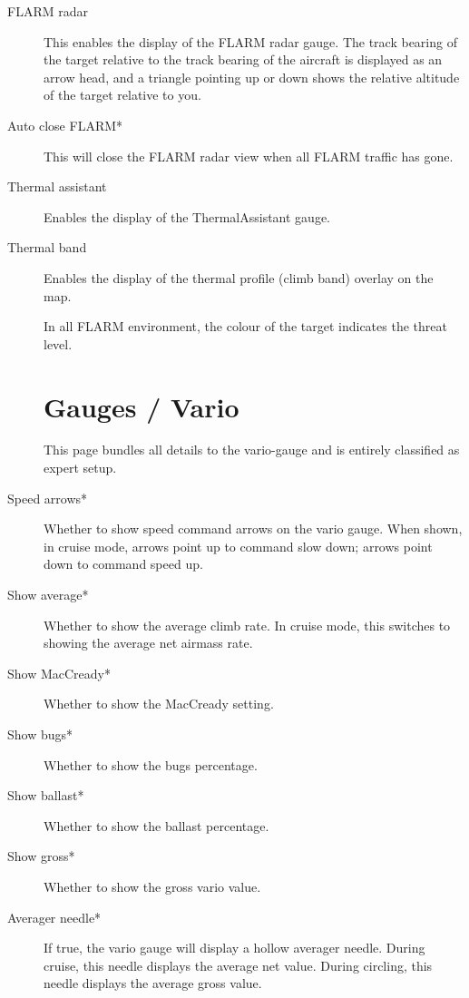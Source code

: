 \begin{description}
\item[FLARM radar]  \label{conf:flarmdisplay} This enables the display of the FLARM 
 radar gauge. The track bearing of the target relative to the track bearing of the 
 aircraft is displayed as an arrow head, and a triangle pointing up or down shows 
 the relative altitude of the target relative to you.
\\
\item[Auto close FLARM*]  This will close the FLARM radar view when all FLARM traffic has gone.
\item[Thermal assistant] \label{conf:thermalassistant} Enables the display of the
ThermalAssistant gauge.
\item[Thermal band] \label{conf:thermalband} Enables the display of the
thermal profile (climb band) overlay on the map.

In all FLARM environment, the colour of the target indicates the threat level.


\section{Gauges / Vario}\label{sec:vario-gauge}

This page bundles all details to the vario-gauge and is entirely classified as expert setup.

\label{conf:variogauge}
\item[Speed arrows*]  \label{conf:variogauge} Whether to show speed command 
  arrows on the vario gauge.
  When shown, in cruise mode, arrows point up to command slow down; arrows point down 
  to command speed up.
\item[Show average*]  Whether to show the average climb rate.  In cruise mode, this 
  switches to showing the average net airmass rate.
\item[Show MacCready*]  Whether to show the MacCready setting.
\item[Show bugs*]  Whether to show the bugs percentage.
\item[Show ballast*]  Whether to show the ballast percentage.
\item[Show gross*]  Whether to show the gross vario value.
\item[Averager needle*]  If true, the vario gauge will display a hollow averager
  needle. During cruise, this needle displays the average net value. During circling, 
  this needle displays the average gross value.
\end{description}


